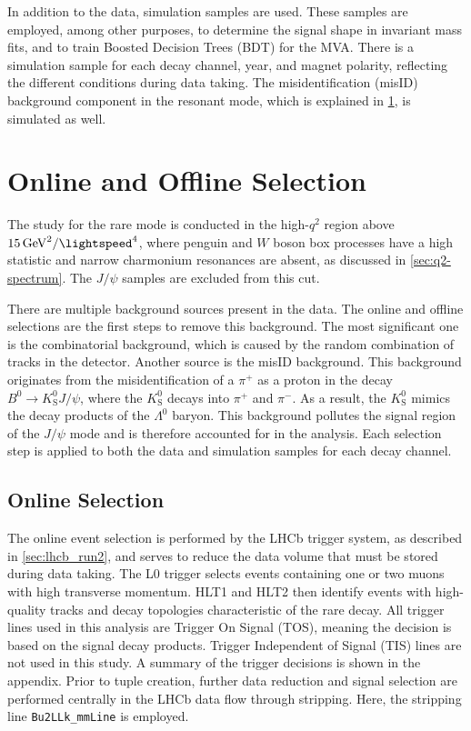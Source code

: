 In addition to the data, simulation samples are used. These samples are employed, among other purposes, to determine the signal shape in invariant mass fits, and to train Boosted Decision Trees (BDT) for the MVA. There is a simulation sample for each decay channel, year, and magnet polarity, reflecting the different conditions during data taking. The misidentification (misID) background component in the resonant mode, which is explained in \cref{sec:run2_selection}, is simulated as well.

\section{Online and Offline Selection}
\label{sec:run2_selection}
The study for the rare mode is conducted in the high-$q^2$ region above $\qty{15}{\giga\electronvolt\tothe{2}\per\lightspeed\tothe{4}}$, where penguin and $W$ boson box processes have a high statistic and narrow charmonium resonances are absent, as discussed in \cref{sec:q2-spectrum}. The $J/\psi$ samples are excluded from this cut.

There are multiple background sources present in the data. The online and offline selections are the first steps to remove this background. The most significant one is the combinatorial background, which is caused by the random combination of tracks in the detector. Another source is the misID background. This background originates from the misidentification of a $\pi^+$ as a proton in the decay $B^0 \to K^0_{\text{S}} J/\psi$, where the $K^0_{\text{S}}$ decays into $\pi^+$ and $\pi^-$. As a result, the $K^0_{\text{S}}$ mimics the decay products of the $\Lambda^0$ baryon. This background pollutes the signal region of the $J/\psi$ mode and is therefore accounted for in the analysis. Each selection step is applied to both the data and simulation samples for each decay channel.

\subsection{Online Selection}
\label{sec:run2_online_selection}
The online event selection is performed by the LHCb trigger system, as described in \cref{sec:lhcb_run2}, and serves to reduce the data volume that must be stored during data taking. The L0 trigger selects events containing one or two muons with high transverse momentum. HLT1 and HLT2 then identify events with high-quality tracks and decay topologies characteristic of the rare decay. All trigger lines used in this analysis are Trigger On Signal (TOS), meaning the decision is based on the signal decay products. Trigger Independent of Signal (TIS) lines are not used in this study. A summary of the trigger decisions is shown in the appendix. Prior to tuple creation, further data reduction and signal selection are performed centrally in the LHCb data flow through stripping. Here, the stripping line \texttt{Bu2LLk\_mmLine} is employed.

